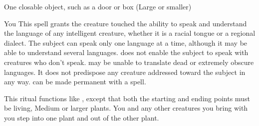 \begin{spelltarget}{One closable object, such as a door or box (Large or smaller)}
\begin{spelltarget}{You}
\spelldur{\durlong}
\spelleffect This spell grants the creature touched the ability to speak and understand the language of any intelligent creature, whether it is a racial tongue or a regional dialect. The subject can speak only one language at a time, although it may be able to understand several languages.  does not enable the subject to speak with creatures who don't speak.
\spellnotes {} may be unable to translate dead or extremely obscure languages. It does not predispose any creature addressed toward the subject in any way.  can be made permanent with a  spell.

\spelleffect This ritual functions like , except that both the starting and ending points must be living, Medium or larger plants. You and any other creatures you bring with you step into one plant and out of the other plant.
\begin{comment}
You can enter any normal plant (Medium or larger) and pass any distance to a plant of the same kind in a single round, regardless of the distance separating the two. The entry plant must be alive. The destination plant need not be familiar to you, but it also must be alive. If you are uncertain of the location of a particular kind of destination plant, you need merely designate direction and distance and the transport via plants spell moves you as close as possible to the desired location. If a particular destination plant is desired but the plant is not living, the spell fails and you are ejected from the entry plant.
\par After completing the spell, you and anyone bring with you can't take any actions until the next turn that each creature would have.
\par You can bring along objects as long as their weight doesn't exceed your maximum load. You may also bring one additional willing Medium or smaller creature (carrying gear or objects up to its maximum load) or its equivalent per three caster levels. Use the following equivalents to determine the maximum number of larger creatures you can bring along: A Large creature counts as two Medium creatures, a Huge creature counts as two Large creatures, and so forth. All creatures to be transported must be in contact with one another, and at least one of those creatures must be in contact with you.
\par You can't use this spell to travel through plant creatures.
\par The destruction of an occupied plant slays you and any creatures you have brought along, and ejects the bodies and all carried objects from the tree.
\end{comment}


\end{spelltarget}
\end{spelltarget}

